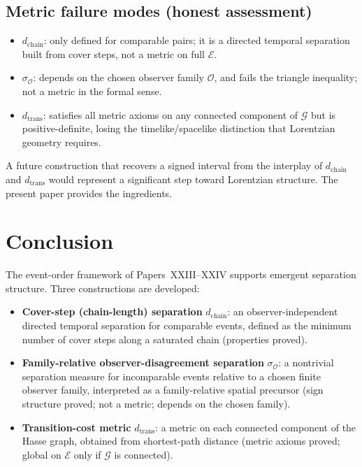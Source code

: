 \documentclass[12pt]{article}
\newcommand{\Ecal}{\mathcal{E}}
\newcommand{\Ocal}{\mathcal{O}}
\newcommand{\Gcal}{\mathcal{G}}
\begin{document}
\subsection{Metric failure modes (honest assessment)}

\begin{itemize}
    \item $d_{\mathrm{chain}}$: only defined for comparable pairs; it is a directed temporal separation built from cover steps, not a metric on full $\Ecal$.
    \item $\sigma_{\Ocal}$: depends on the chosen observer family $\Ocal$, and fails the triangle inequality; not a metric in the formal sense.
    \item $d_{\mathrm{trans}}$: satisfies all metric axioms on any connected component of $\Gcal$ but is positive-definite, losing the timelike/spacelike distinction that Lorentzian geometry requires.
\end{itemize}

A future construction that recovers a signed interval from the interplay of $d_{\mathrm{chain}}$ and $d_{\mathrm{trans}}$ would represent a significant step toward Lorentzian structure. The present paper provides the ingredients.

\section{Conclusion}\label{sec:conclusion}

The event-order framework of Papers~XXIII--XXIV supports emergent separation structure. Three constructions are developed:
\begin{itemize}
    \item \textbf{Cover-step (chain-length) separation} $d_{\mathrm{chain}}$: an observer-independent directed temporal separation for comparable events, defined as the minimum number of cover steps along a saturated chain (properties proved).
    \item \textbf{Family-relative observer-disagreement separation} $\sigma_{\Ocal}$: a nontrivial separation measure for incomparable events relative to a chosen finite observer family, interpreted as a family-relative spatial precursor (sign structure proved; not a metric; depends on the chosen family).
    \item \textbf{Transition-cost metric} $d_{\mathrm{trans}}$: a metric on each connected component of the Hasse graph, obtained from shortest-path distance (metric axioms proved; global on $\Ecal$ only if $\Gcal$ is connected).
\end{itemize}
\end{document}
